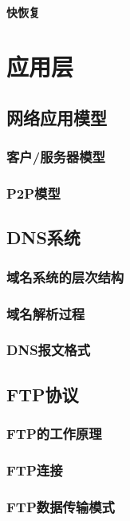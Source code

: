 \documentclass[lang=cn,newtx,10pt,scheme=chinese]{../../elegantbook}
\begin{document}
\subsubsection{快恢复}

\chapter{应用层}

\section{网络应用模型}
\subsection{客户/服务器模型}
\subsection{P2P模型}

\section{DNS系统}
\subsection{域名系统的层次结构}
\subsection{域名解析过程}
\subsection{DNS报文格式}

\section{FTP协议}
\subsection{FTP的工作原理}
\subsection{FTP连接}
\subsection{FTP数据传输模式}
\end{document}
